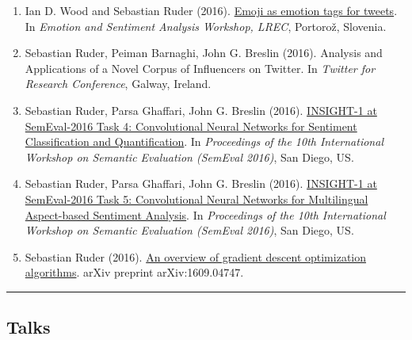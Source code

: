 \documentclass[10pt,letterpaper]{article}
\makeatletter
\newcommand{\headerrow}[2]
{\begin{tabular*}{\linewidth}{l@{\extracolsep{\fill}}r}
	#1 &
	#2 \\
\end{tabular*}}
\makeatother
\begin{document}
\begin{enumerate}
	\item Ian D. Wood and Sebastian Ruder (2016). \href{http://gsi.dit.upm.es/esa2016/Proceedings-ESA2016.pdf}{Emoji as emotion tags for tweets}. In \textit{Emotion and Sentiment Analysis Workshop, LREC}, Portorož, Slovenia.
	
	\item Sebastian Ruder, Peiman Barnaghi, John G. Breslin (2016). Analysis and Applications of a Novel Corpus of Influencers on Twitter. In \textit{Twitter for Research Conference}, Galway, Ireland.
	
	\item Sebastian Ruder, Parsa Ghaffari, John G. Breslin (2016). \href{http://www.anthology.aclweb.org/S/S16/S16-1026.pdf}{INSIGHT-1 at SemEval-2016 Task 4: Convolutional Neural Networks for Sentiment Classification and Quantification}. In \textit{Proceedings of the 10th International Workshop on Semantic Evaluation (SemEval 2016)}, San Diego, US.
	
	\item Sebastian Ruder, Parsa Ghaffari, John G. Breslin (2016). \href{http://www.aclweb.org/anthology/S/S16/S16-1053.pdf}{INSIGHT-1 at SemEval-2016 Task 5: Convolutional Neural Networks for Multilingual Aspect-based Sentiment Analysis}. In \textit{Proceedings of the 10th International Workshop on Semantic Evaluation (SemEval 2016)}, San Diego, US.
	
	\item Sebastian Ruder (2016). \href{https://arxiv.org/pdf/1609.04747.pdf}{An overview of gradient descent optimization algorithms}. arXiv preprint arXiv:1609.04747.

\end{enumerate}

%
%	
%

\hrule
\vspace{-0.4em}
\subsection*{Talks}
\end{document}
